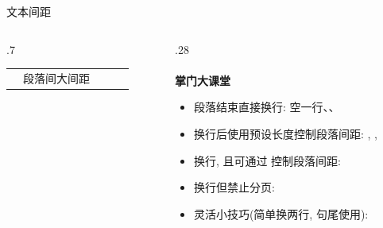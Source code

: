 \begin{frame}{文本间距}
\begin{columns}[T, onlytextwidth]
\begin{column}{.7\textwidth}
\begin{table}[h]
\begin{tabular}{lll|lll}
					\cmd{bigskip}   & \multicolumn{2}{l|}{段落间大间距} & \\
				\end{tabular}
			\end{table}
		\end{column}
		\begin{column}{.28\textwidth}
			\\~\\
			\textbf{掌门大课堂}
			\begin{itemize}
				\item 段落结束直接换行: 空一行、、
				\item 换行后使用预设长度控制段落间距: , , 
				\item 换行, 且可通过  控制段落间距: \cmd{\textbackslash}
				\item 换行但禁止分页: \cmd{\textbackslash*}
				\item 灵活小技巧(简单换两行, 句尾使用): \cmd{\textbackslash}\alert{\fverb{\textasciitilde}}\cmd{\textbackslash}
			\end{itemize}
			\vfill
		\end{column}
	\end{columns}
\end{frame}

